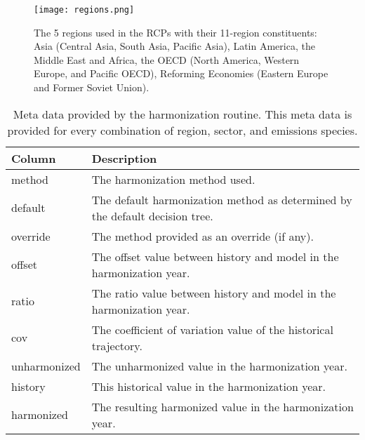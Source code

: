 \begin{figure}
  \begin{center}
    \texttt{[image: regions.png]}
    \caption[]{
      \label{fig:regions}
      The 5 regions used in the RCPs with their 11-region constituents: Asia
      (Central Asia, South Asia, Pacific Asia), Latin America, the Middle East
      and Africa, the OECD (North America, Western Europe, and Pacific OECD),
      Reforming Economies (Eastern Europe and Former Soviet Union).
    }
  \end{center}
\end{figure}


\begin{table}[]
\centering
\caption{Meta data provided by the  harmonization routine. This meta data is provided for every combination of region, sector, and emissions species.}
\label{tab:metadata}
\begin{tabular}{|p{2cm}|p{8cm}|}
\hline
Column       & Description                                                                  \\
\hline
\hline
method       & The harmonization method used.                                               \\
\hline
default      & The default harmonization method as determined by the default decision tree. \\
\hline
override     & The method provided as an override (if any).                                 \\
\hline
offset       & The offset value between history and model in the harmonization year.        \\
\hline
ratio        & The ratio value between history and model in the harmonization year.         \\
\hline
cov          & The coefficient of variation value of the historical trajectory.                           \\
\hline
unharmonized & The unharmonized value in the harmonization year.                            \\
\hline
history      & This historical value in the harmonization year.                             \\
\hline
harmonized   & The resulting harmonized value in the harmonization year.\\
\hline
\end{tabular}
\end{table}
